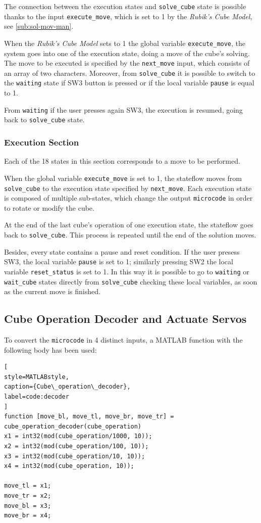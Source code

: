 \documentclass{report}
\begin{document}
The connection between the execution states and \texttt{solve\_cube} state is possible thanks to the input \texttt{execute\_move}, which is set to 1 by the \textit{Rubik's Cube Model}, see \ref{sub:sol-mov-man}. 

When the \textit{Rubik's Cube Model} sets to 1 the global variable \texttt{execute\_move}, the system goes into one of the execution state, doing a move of the cube's solving. The move to be executed is specified by the \texttt{next\_move} input, which consists of an array of two characters. Moreover, from \texttt{solve\_cube} it is possible to switch to the \texttt{waiting} state if SW3 button is pressed or if the local variable \texttt{pause} is equal to 1.

From \texttt{waiting} if the user presses again SW3, the execution is resumed, going back to \texttt{solve\_cube} state.

\subsubsection{Execution Section}
Each of the 18 states in this section corresponds to a move to be performed. 

When the global variable \texttt{execute\_move} is set to 1, the stateflow moves from \texttt{solve\_cube} to the execution state specified by \texttt{next\_move}.
Each execution state is composed of multiple sub-states, which change the output \texttt{microcode} in order to rotate or modify the cube.

At the end of the last cube's operation of one execution state, the stateflow goes back to \texttt{solve\_cube}. This process is repeated until the end of the solution moves.

Besides, every state contains a pause and reset condition. If 
the user presess SW3, the local variable \texttt{pause} is set to 1; similarly pressing SW2 the local variable \texttt{reset\_status} is set to 1. In this way it is possible to go to \texttt{waiting} or \texttt{wait\_cube} states directly from \texttt{solve\_cube} checking these local variables, as soon as the current move is finished.

\subsection{Cube Operation Decoder and Actuate Servos} \label{sec:motor_pos_decoder}
To convert the \texttt{microcode} in 4 distinct inputs, a MATLAB function with the following body has been used:
\begin{lstlisting}[
style=MATLABstyle,
caption={Cube\_operation\_decoder},
label=code:decoder
] 
function [move_bl, move_tl, move_br, move_tr] = cube_operation_decoder(cube_operation)
x1 = int32(mod(cube_operation/1000, 10));
x2 = int32(mod(cube_operation/100, 10));
x3 = int32(mod(cube_operation/10, 10));
x4 = int32(mod(cube_operation, 10));

move_tl = x1;
move_tr = x2;
move_bl = x3;
move_br = x4;
\end{lstlisting}
\end{document}
